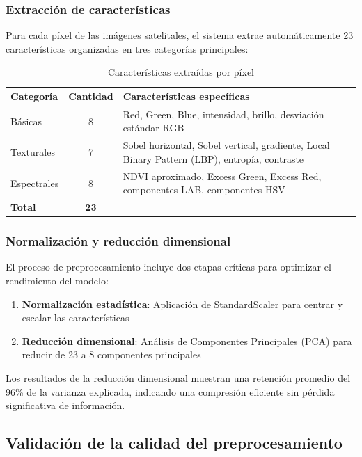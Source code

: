 \subsubsection{Extracción de características}

Para cada píxel de las imágenes satelitales, el sistema extrae automáticamente 23 características organizadas en tres categorías principales:

\begin{table}[h]
\centering
\caption{Características extraídas por píxel}
\begin{tabular}{|l|c|p{8cm}|}
\hline
	\textbf{Categoría} & \textbf{Cantidad} & \textbf{Características específicas} \\
\hline
Básicas & 8 & Red, Green, Blue, intensidad, brillo, desviación estándar RGB \\
\hline
Texturales & 7 & Sobel horizontal, Sobel vertical, gradiente, Local Binary Pattern (LBP), entropía, contraste \\
\hline
Espectrales & 8 & NDVI aproximado, Excess Green, Excess Red, componentes LAB, componentes HSV \\
\hline
	\textbf{Total} & \textbf{23} & \\
\hline
\end{tabular}
\label{tab:features}
\end{table}

\subsubsection{Normalización y reducción dimensional}

El proceso de preprocesamiento incluye dos etapas críticas para optimizar el rendimiento del modelo:

\begin{enumerate}
	\item \textbf{Normalización estadística}: Aplicación de StandardScaler para centrar y escalar las características
	\item \textbf{Reducción dimensional}: Análisis de Componentes Principales (PCA) para reducir de 23 a 8 componentes principales
\end{enumerate}

Los resultados de la reducción dimensional muestran una retención promedio del 96\% de la varianza explicada, indicando una compresión eficiente sin pérdida significativa de información.

\subsection{Validación de la calidad del preprocesamiento}


